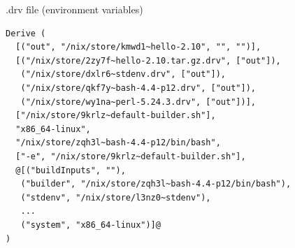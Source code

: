 \documentclass[aspectratio=169]{beamer}
\begin{document}
\begin{frame}[fragile]{.drv file (environment variables)}
    \footnotesize
\begin{lstlisting}[style=base,breaklines=false]
Derive (
  [("out", "/nix/store/kmwd1~hello-2.10", "", "")],
  [("/nix/store/2zy7f~hello-2.10.tar.gz.drv", ["out"]),
   ("/nix/store/dxlr6~stdenv.drv", ["out"]),
   ("/nix/store/qkf7y~bash-4.4-p12.drv", ["out"]),
   ("/nix/store/wy1na~perl-5.24.3.drv", ["out"])],
  ["/nix/store/9krlz~default-builder.sh"],
  "x86_64-linux",
  "/nix/store/zqh3l~bash-4.4-p12/bin/bash",
  ["-e", "/nix/store/9krlz~default-builder.sh"],
  @[("buildInputs", ""),
   ("builder", "/nix/store/zqh3l~bash-4.4-p12/bin/bash"),
   ("stdenv", "/nix/store/l3nz0~stdenv"),
   ...
   ("system", "x86_64-linux")]@
)
\end{lstlisting}
\end{frame}
\end{document}
